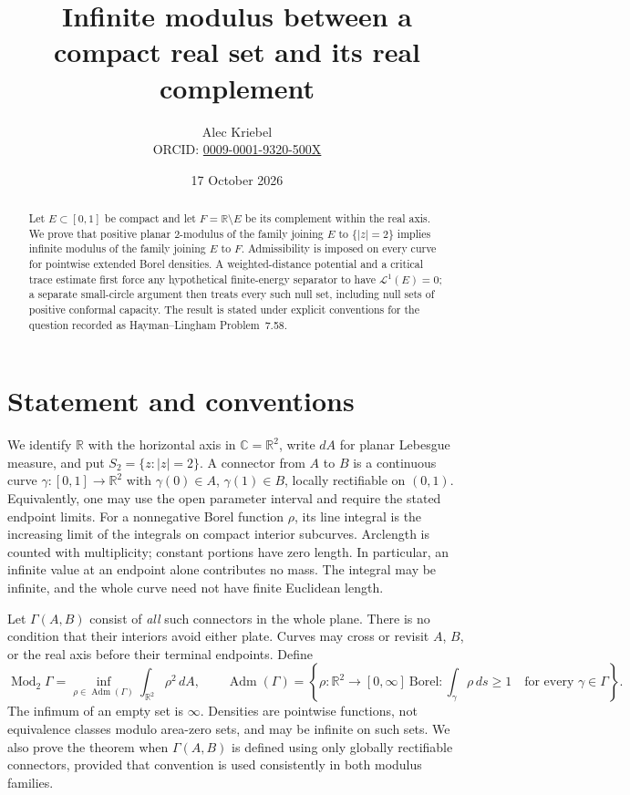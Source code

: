 \documentclass[11pt]{article}
\title{Infinite modulus between a compact real set and its real complement}
\author{Alec Kriebel\\
  \small ORCID: \href{https://orcid.org/0009-0001-9320-500X}{0009-0001-9320-500X}}
\date{17 October 2026}
\newcommand{\R}{\mathbb R}
\newcommand{\C}{\mathbb C}
\newcommand{\Mod}{\operatorname{Mod}_2}
\newcommand{\Adm}{\operatorname{Adm}}
\newcommand{\length}{\mathcal L^1}
\begin{document}
\maketitle

\begin{abstract}
Let $E\subset[0,1]$ be compact and let $F=\R\setminus E$ be its complement
within the real axis. We prove that positive planar $2$-modulus of the family
joining $E$ to $\{|z|=2\}$ implies infinite modulus of the family joining $E$
to $F$. Admissibility is imposed on every curve for pointwise extended Borel
densities. A weighted-distance potential and a critical trace estimate first
force any hypothetical finite-energy separator to have $\length(E)=0$; a
separate small-circle argument then treats every such null set, including
null sets of positive conformal capacity. The result is stated under explicit
conventions for the question recorded as Hayman--Lingham Problem~7.58.
\end{abstract}

\section{Statement and conventions}

We identify $\R$ with the horizontal axis in $\C=\R^2$, write $dA$ for
planar Lebesgue measure, and put $S_2=\{z:|z|=2\}$. A connector from $A$ to
$B$ is a continuous curve $\gamma:[0,1]\to\R^2$ with
$\gamma(0)\in A$, $\gamma(1)\in B$, locally rectifiable on $(0,1)$.
Equivalently, one may use the open parameter interval and require the stated
endpoint limits. For a nonnegative Borel function $\rho$, its line integral
is the increasing limit of the integrals on compact interior subcurves.
Arclength is counted with multiplicity; constant portions have zero length.
In particular, an infinite value at an endpoint alone contributes no mass.
The integral may be infinite, and the whole curve need not have finite
Euclidean length.

Let $\Gamma(A,B)$ consist of \emph{all} such connectors in the whole plane.
There is no condition that their interiors avoid either plate. Curves may
cross or revisit $A$, $B$, or the real axis before their terminal endpoints.
Define
\[
 \Mod\Gamma=\inf_{\rho\in\Adm(\Gamma)}\int_{\R^2}\rho^2\,dA,
 \qquad
 \Adm(\Gamma)=\left\{\rho:\R^2\to[0,\infty]\ \text{Borel}:
       \int_\gamma\rho\,ds\geq1\quad\text{for every }\gamma\in\Gamma\right\}.
\]
The infimum of an empty set is $\infty$. Densities are pointwise functions,
not equivalence classes modulo area-zero sets, and may be infinite on such
sets. We also prove the theorem when $\Gamma(A,B)$ is defined using only
globally rectifiable connectors, provided that convention is used
consistently in both modulus families.
\end{document}
